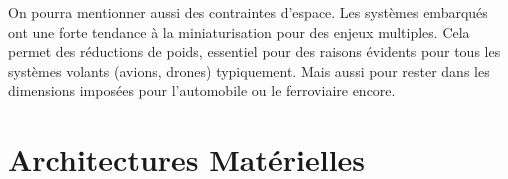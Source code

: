 \documentclass[french, a4paper, 11pt, twoside, pdftex]{StyleThese}
\begin{document}
		On pourra mentionner aussi des contraintes d'espace. Les systèmes embarqués ont une forte tendance à la miniaturisation pour des enjeux multiples. Cela permet des réductions de poids, essentiel pour des raisons évidents pour tous les systèmes volants (avions, drones) typiquement. Mais aussi pour rester dans les dimensions imposées pour l'automobile ou le ferroviaire encore. 
		

			
\section{Architectures Matérielles}
\end{document}
